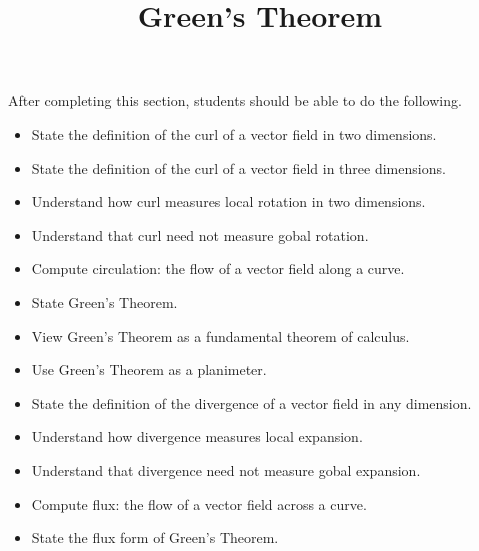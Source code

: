 \documentclass{ximera}
\title{Green's Theorem}
\begin{document}
\begin{abstract}
\end{abstract}
\maketitle

\begin{sectionOutcomes}

After completing this section, students should be able to do the following.

\begin{itemize}
\item State the definition of the curl of a vector field in two dimensions.
\item State the definition of the curl of a vector field in three dimensions.
\item Understand how curl measures local rotation in two dimensions.
\item Understand that curl need not measure gobal rotation.
\item Compute circulation: the flow of a vector field along a curve.
\item State Green's Theorem.
\item View Green's Theorem as a fundamental theorem of calculus.
\item Use Green's Theorem as a planimeter.
\item State the definition of the divergence of a vector field in any dimension.
\item Understand how divergence measures local expansion.
\item Understand that divergence need not measure gobal expansion.
\item Compute flux: the flow of a vector field across a curve.
\item State the flux form of Green's Theorem.
\end{itemize}

\end{sectionOutcomes}
\end{document}
